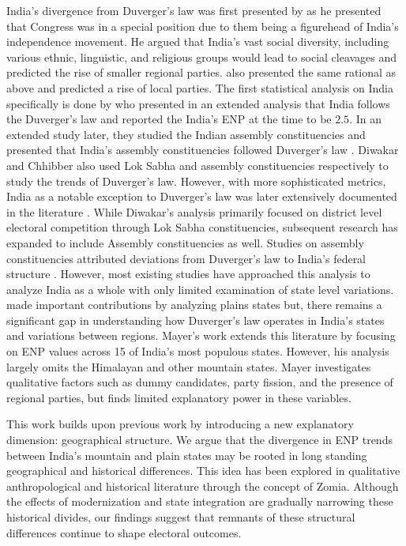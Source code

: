 \begin{sloppypar}
 India's divergence from Duverger's law was first presented by \cite{lijphart1994} as he presented that Congress was in a special position due to them being a figurehead of India's independence movement. He argued that India's vast social diversity, including various ethnic, linguistic, and religious groups would lead to social cleavages and predicted the rise of smaller regional parties. \cite{taagepera1989seats,sridharan1997duverger} also presented the same rational as above and predicted a rise of local parties. The first statistical analysis on India specifically is done by \cite{chhibber1998party} who presented in an extended analysis that India follows the Duverger's law and reported the India's ENP at the time to be $2.5$. In an extended study later, they studied the Indian assembly constituencies and presented that India's assembly constituencies followed Duverger's law \citep{chhibber2006duvergerian}. Diwakar and Chhibber also used Lok Sabha and assembly constituencies respectively to study the trends of Duverger’s law. However, with more sophisticated metrics, India as a notable exception to Duverger's law was later extensively documented in the literature \citep{diwakar2007duverger, diwakar2010party, mayer2013gross,carneggie_duverger}. While Diwakar's analysis primarily focused on district level electoral competition through Lok Sabha constituencies, subsequent research has expanded to include Assembly constituencies as well. Studies on assembly constituencies attributed deviations from Duverger's law to India's federal structure \citep{chhibber2006duvergerian}. However, most existing studies have approached this analysis to analyze India as a whole with only limited examination of state level variations. \cite{mayer2013gross} made important contributions by analyzing plains states but, there remains a significant gap in understanding how Duverger's law operates in India's states and variations between regions.   Mayer's work extends this literature by focusing on ENP values across 15 of India's most populous states. However, his analysis largely omits the Himalayan and other mountain states. Mayer  investigates qualitative factors such as dummy candidates, party fission, and the presence of regional parties, but finds limited explanatory power in these variables. 

This work builds upon previous work by introducing a new explanatory dimension: geographical structure. We argue that the divergence in ENP trends between India's mountain and plain states may be rooted in long standing geographical and historical differences. This  idea has been explored in qualitative anthropological and historical literature through the concept of Zomia. Although the effects of modernization and state integration are gradually narrowing these historical divides, our findings suggest that remnants of these structural differences continue to shape electoral outcomes.



\end{sloppypar}
